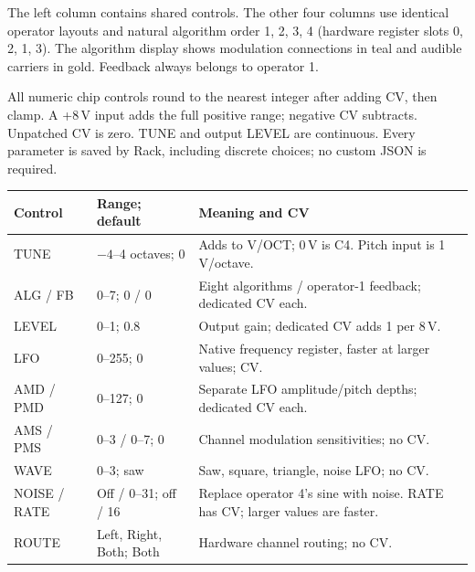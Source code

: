The left column contains shared controls. The other four columns use identical
operator layouts and natural algorithm order 1, 2, 3, 4 (hardware register
slots 0, 2, 1, 3). The algorithm display shows modulation connections in teal
and audible carriers in gold. Feedback always belongs to operator 1.

All numeric chip controls round to the nearest integer after adding CV,
then clamp. A +8\,V input adds the full positive range; negative CV subtracts.
Unpatched CV is zero. TUNE and output LEVEL are continuous. Every parameter
is saved by Rack, including discrete choices; no custom JSON is required.

\begin{longtable}{@{}p{}p{}p{}@{}}
\toprule Control & Range; default & Meaning and CV \\\midrule\endhead
TUNE & $-4$--4 octaves; 0 & Adds to V/OCT; 0\,V is C4. Pitch input is 1\,V/octave. \\
ALG / FB & 0--7; 0 / 0 & Eight algorithms / operator-1 feedback; dedicated CV each. \\
LEVEL & 0--1; 0.8 & Output gain; dedicated CV adds 1 per 8\,V. \\
LFO & 0--255; 0 & Native frequency register, faster at larger values; CV. \\
AMD / PMD & 0--127; 0 & Separate LFO amplitude/pitch depths; dedicated CV each. \\
AMS / PMS & 0--3 / 0--7; 0 & Channel modulation sensitivities; no CV. \\
WAVE & 0--3; saw & Saw, square, triangle, noise LFO; no CV. \\
NOISE / RATE & Off / 0--31; off / 16 & Replace operator 4's sine with noise. RATE has CV; larger values are faster. \\
ROUTE & Left, Right, Both; Both & Hardware channel routing; no CV. \\
\bottomrule
\end{longtable}

